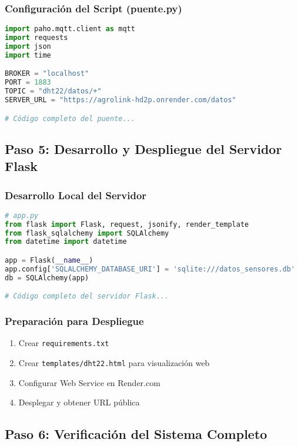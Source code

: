 \documentclass[12pt]{article}
\begin{document}
\subsubsection{Configuración del Script (puente.py)}
\begin{lstlisting}[language=Python, basicstyle=\small\ttfamily]
import paho.mqtt.client as mqtt
import requests
import json
import time

BROKER = "localhost"
PORT = 1883
TOPIC = "dht22/datos/+"
SERVER_URL = "https://agrolink-hd2p.onrender.com/datos"

# Código completo del puente...
\end{lstlisting}

\subsection{Paso 5: Desarrollo y Despliegue del Servidor Flask}

\subsubsection{Desarrollo Local del Servidor}
\begin{lstlisting}[language=Python, basicstyle=\small\ttfamily]
# app.py
from flask import Flask, request, jsonify, render_template
from flask_sqlalchemy import SQLAlchemy
from datetime import datetime

app = Flask(__name__)
app.config['SQLALCHEMY_DATABASE_URI'] = 'sqlite:///datos_sensores.db'
db = SQLAlchemy(app)

# Código completo del servidor Flask...
\end{lstlisting}

\subsubsection{Preparación para Despliegue}
\begin{enumerate}
    \item Crear \texttt{requirements.txt}
    \item Crear \texttt{templates/dht22.html} para visualización web
    \item Configurar Web Service en Render.com
    \item Desplegar y obtener URL pública
\end{enumerate}

\subsection{Paso 6: Verificación del Sistema Completo}
\end{document}
